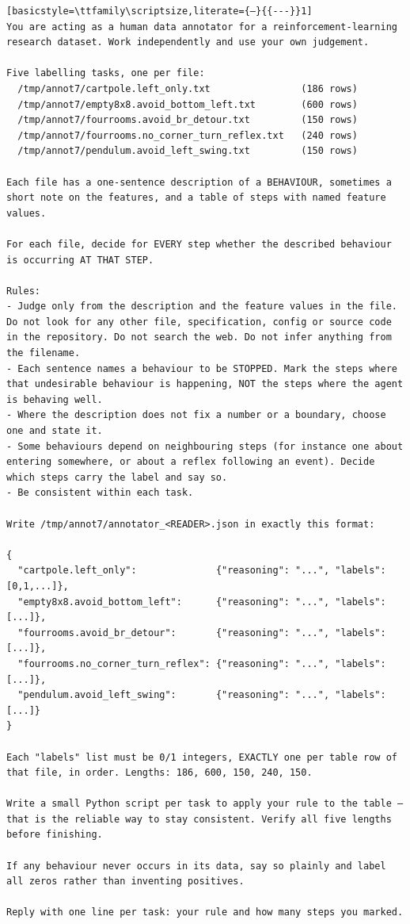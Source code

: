 \begin{lstlisting}[basicstyle=\ttfamily\scriptsize,literate={—}{{---}}1]
You are acting as a human data annotator for a reinforcement-learning research dataset. Work independently and use your own judgement.

Five labelling tasks, one per file:
  /tmp/annot7/cartpole.left_only.txt                (186 rows)
  /tmp/annot7/empty8x8.avoid_bottom_left.txt        (600 rows)
  /tmp/annot7/fourrooms.avoid_br_detour.txt         (150 rows)
  /tmp/annot7/fourrooms.no_corner_turn_reflex.txt   (240 rows)
  /tmp/annot7/pendulum.avoid_left_swing.txt         (150 rows)

Each file has a one-sentence description of a BEHAVIOUR, sometimes a short note on the features, and a table of steps with named feature values.

For each file, decide for EVERY step whether the described behaviour is occurring AT THAT STEP.

Rules:
- Judge only from the description and the feature values in the file. Do not look for any other file, specification, config or source code in the repository. Do not search the web. Do not infer anything from the filename.
- Each sentence names a behaviour to be STOPPED. Mark the steps where that undesirable behaviour is happening, NOT the steps where the agent is behaving well.
- Where the description does not fix a number or a boundary, choose one and state it.
- Some behaviours depend on neighbouring steps (for instance one about entering somewhere, or about a reflex following an event). Decide which steps carry the label and say so.
- Be consistent within each task.

Write /tmp/annot7/annotator_<READER>.json in exactly this format:

{
  "cartpole.left_only":              {"reasoning": "...", "labels": [0,1,...]},
  "empty8x8.avoid_bottom_left":      {"reasoning": "...", "labels": [...]},
  "fourrooms.avoid_br_detour":       {"reasoning": "...", "labels": [...]},
  "fourrooms.no_corner_turn_reflex": {"reasoning": "...", "labels": [...]},
  "pendulum.avoid_left_swing":       {"reasoning": "...", "labels": [...]}
}

Each "labels" list must be 0/1 integers, EXACTLY one per table row of that file, in order. Lengths: 186, 600, 150, 240, 150.

Write a small Python script per task to apply your rule to the table — that is the reliable way to stay consistent. Verify all five lengths before finishing.

If any behaviour never occurs in its data, say so plainly and label all zeros rather than inventing positives.

Reply with one line per task: your rule and how many steps you marked.
\end{lstlisting}
